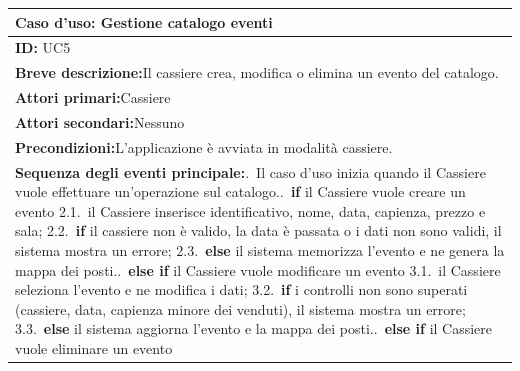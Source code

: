 \begin{center}
\small
\begin{tabular}{|p{}|}
\hline
\textbf{Caso d'uso: Gestione catalogo eventi} \\ \hline
\textbf{ID:} UC5 \\ \hline
\textbf{Breve descrizione:}\newline Il cassiere crea, modifica o elimina un evento del catalogo. \\ \hline
\textbf{Attori primari:}\newline Cassiere \\ \hline
\textbf{Attori secondari:}\newline Nessuno \\ \hline
\textbf{Precondizioni:}\newline L'applicazione è avviata in modalità cassiere. \\ \hline
\textbf{Sequenza degli eventi principale:}\newline 1.~Il caso d'uso inizia quando il Cassiere vuole effettuare un'operazione sul catalogo.\newline
2.~\textbf{if} il Cassiere vuole creare un evento\newline
\hspace*{1em}2.1.~il Cassiere inserisce identificativo, nome, data, capienza, prezzo e sala;\newline
\hspace*{1em}2.2.~\textbf{if} il cassiere non è valido, la data è passata o i dati non sono validi, il sistema mostra un errore;\newline
\hspace*{1em}2.3.~\textbf{else} il sistema memorizza l'evento e ne genera la mappa dei posti.\newline
3.~\textbf{else if} il Cassiere vuole modificare un evento\newline
\hspace*{1em}3.1.~il Cassiere seleziona l'evento e ne modifica i dati;\newline
\hspace*{1em}3.2.~\textbf{if} i controlli non sono superati (cassiere, data, capienza minore dei venduti), il sistema mostra un errore;\newline
\hspace*{1em}3.3.~\textbf{else} il sistema aggiorna l'evento e la mappa dei posti.\newline
4.~\textbf{else if} il Cassiere vuole eliminare un evento\newline

\end{tabular}
\end{center}
